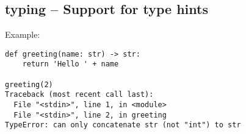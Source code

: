 \subsection{typing -- Support for type hints}
Example:

\begin{verbatim}
def greeting(name: str) -> str:
    return 'Hello ' + name

greeting(2)
Traceback (most recent call last):
  File "<stdin>", line 1, in <module>
  File "<stdin>", line 2, in greeting
TypeError: can only concatenate str (not "int") to str
\end{verbatim}

%
